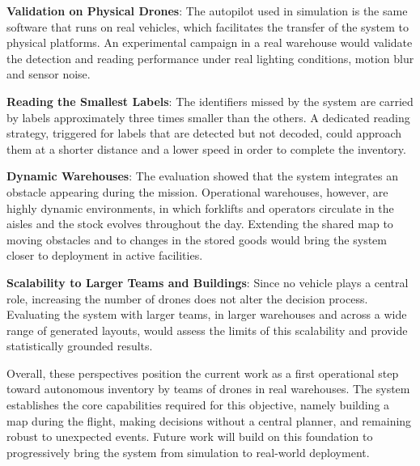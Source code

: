 \textbf{Validation on Physical Drones}: The autopilot used in simulation is the
same software that runs on real vehicles, which facilitates the transfer of the
system to physical platforms. An experimental campaign in a real warehouse would
validate the detection and reading performance under real lighting conditions,
motion blur and sensor noise.

\textbf{Reading the Smallest Labels}: The identifiers missed by the system are
carried by labels approximately three times smaller than the others. A dedicated
reading strategy, triggered for labels that are detected but not decoded, could
approach them at a shorter distance and a lower speed in order to complete the
inventory.

\textbf{Dynamic Warehouses}: The evaluation showed that the system integrates an
obstacle appearing during the mission. Operational warehouses, however, are
highly dynamic environments, in which forklifts and operators circulate in the
aisles and the stock evolves throughout the day. Extending the shared map to
moving obstacles and to changes in the stored goods would bring the system closer
to deployment in active facilities.

\textbf{Scalability to Larger Teams and Buildings}: Since no vehicle plays a
central role, increasing the number of drones does not alter the decision
process. Evaluating the system with larger teams, in larger warehouses and across
a wide range of generated layouts, would assess the limits of this scalability
and provide statistically grounded results.

Overall, these perspectives position the current work as a first operational step
toward autonomous inventory by teams of drones in real warehouses. The system
establishes the core capabilities required for this objective, namely building a
map during the flight, making decisions without a central planner, and remaining
robust to unexpected events. Future work will build on this foundation to
progressively bring the system from simulation to real-world deployment.

